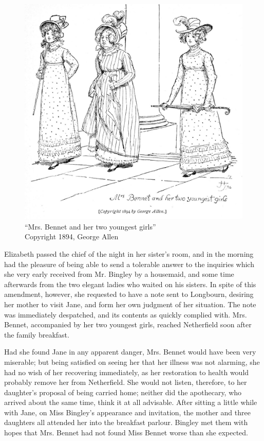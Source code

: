 \begin{figure}[htbp]
    \centering
    \includegraphics[width=\textwidth]{illustrations/i_082_a.jpg}
    \caption{“Mrs. Bennet and her two youngest girls”\\ Copyright 1894, George Allen}
    \label{fig:image}
\end{figure}


Elizabeth passed the chief of the night in her sister's room, and in the morning had the pleasure of being able to send a tolerable answer to the inquiries which she very early received from Mr. Bingley by a housemaid, and some time afterwards from the two elegant ladies who waited on his sisters. In spite of this amendment, however, she requested to have a note sent to Longbourn, desiring her mother to visit Jane, and form her own judgment of her situation. The note was immediately despatched, and its contents as quickly complied with. Mrs. Bennet, accompanied by her two youngest girls, reached Netherfield soon after the family breakfast.

Had she found Jane in any apparent danger, Mrs. Bennet would have been very miserable; but being satisfied on seeing her that her illness was not alarming, she had no wish of her recovering immediately, as her restoration to health would probably remove her from Netherfield. She would not listen, therefore, to her daughter's proposal of being carried home; neither did the apothecary, who arrived about the same time, think it at all advisable. After sitting a little while with Jane, on Miss Bingley's appearance and invitation, the mother and three daughters all attended her into the breakfast parlour. Bingley met them with hopes that Mrs. Bennet had not found Miss Bennet worse than she expected.

